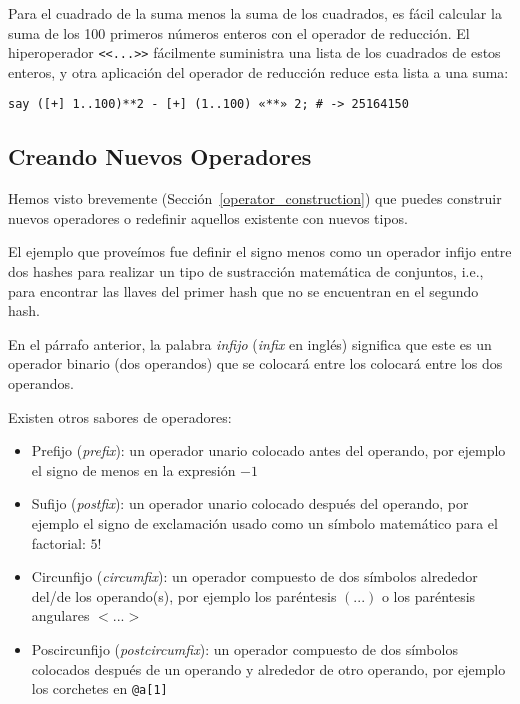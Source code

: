 Para el cuadrado de la suma menos la suma de los cuadrados, 
es fácil calcular la suma de los 100 primeros números enteros
con el operador de reducción. El hiperoperador \verb|<<...>>|
fácilmente suministra una lista de los cuadrados de estos 
enteros, y otra aplicación del operador de reducción reduce esta 
lista a una suma:

\begin{verbatim}
say ([+] 1..100)**2 - [+] (1..100) «**» 2; # -> 25164150
\end{verbatim}

\subsection{Creando Nuevos Operadores}

Hemos visto brevemente (Sección~\ref{operator_construction})
que puedes construir nuevos operadores o redefinir aquellos existente
con nuevos tipos.

El ejemplo que proveímos fue definir el signo menos
como un operador infijo entre dos hashes para realizar un tipo
de sustracción matemática de conjuntos, i.e., para encontrar las llaves
del primer hash que no se encuentran en el segundo hash.

En el párrafo anterior, la palabra \emph{infijo} (\emph{infix} en inglés)
significa que este es un operador binario (dos operandos) que 
se colocará entre los colocará entre los dos operandos.

Existen otros sabores de operadores:
\begin{itemize}
\item Prefijo (\emph{prefix}): un operador unario colocado antes del
operando, por ejemplo el signo de menos en la expresión $-1$

\item Sufijo (\emph{postfix}): un operador unario colocado después del 
operando, por ejemplo el signo de exclamación usado como un símbolo
matemático para el factorial: $5!$

\item Circunfijo (\emph{circumfix}): un operador compuesto de dos símbolos
alrededor del/de los operando(s), por ejemplo los paréntesis $(...)$ o los 
paréntesis angulares $<...>$

\item Poscircunfijo (\emph{postcircumfix}): un operador compuesto de dos símbolos
colocados después de un operando y alrededor de otro operando, por ejemplo
los corchetes en \verb'@a[1]'
\end{itemize}

